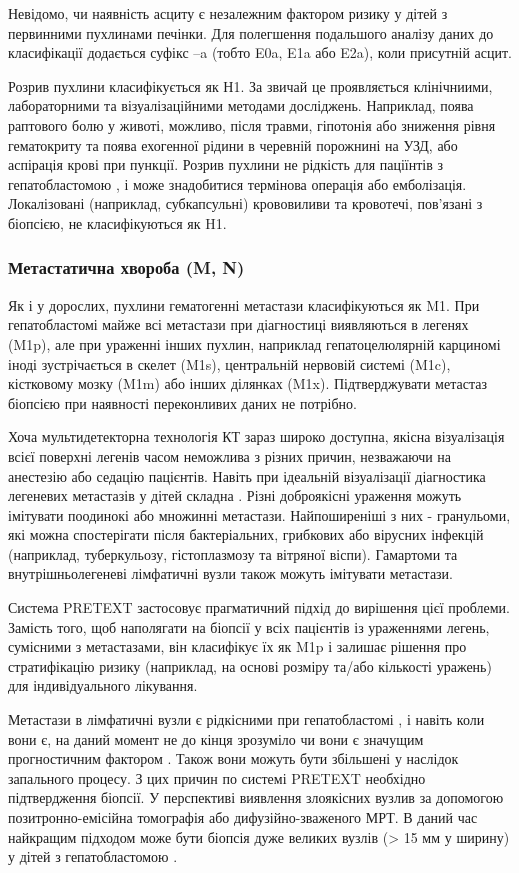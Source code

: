 Невідомо, чи наявність асциту є незалежним фактором ризику у дітей з первинними пухлинами печінки. Для полегшення подальшого аналізу даних до класифікації додається суфікс –a (тобто E0a, E1a або E2a), коли присутній асцит.

Розрив пухлини класифікується як Н1. За звичай це проявляється  клінічниими, лабораторними та візуалізаційними методами досліджень. Наприклад, поява раптового болю у животі, можливо, після травми, гіпотонія або зниження рівня гематокриту та поява ехогенної рідини в черевній порожнині на УЗД, або аспірація крові при пункції. Розрив пухлини не рідкість для паціїнтів з гепатобластомою \cite{pmid24132546}, і може знадобитися термінова операція або емболізація. Локалізовані (наприклад, субкапсульні) крововиливи та кровотечі, пов’язані з біопсією, не класифікуються як H1.
\subsubsection{Метастатична хвороба (M, N)}
Як і у дорослих, пухлини гематогенні метастази класифікуються як M1. При гепатобластомі майже всі метастази при діагностиці виявляються в легенях (M1p), але при ураженні інших пухлин, наприклад гепатоцелюлярній карциномі іноді зустрічається в скелет (M1s), центральній нервовій системі (M1c), кістковому мозку (M1m) або інших ділянках (M1x). Підтверджувати метастаз біопсією при наявності переконливих даних не потрібно.  

Хоча мультидетекторна технологія КТ зараз широко доступна, якісна візуалізація всієї поверхні легенів часом неможлива з різних причин, незважаючи на анестезію або седацію пацієнтів. Навіть при ідеальній візуалізації діагностика легеневих метастазів у дітей складна \cite{pmid24362406}. Різні доброякісні ураження можуть імітувати поодинокі або множинні метастази. Найпоширеніші з них - гранульоми, які можна спостерігати після бактеріальних, грибкових або вірусних інфекцій (наприклад, туберкульозу, гістоплазмозу та вітряної віспи). Гамартоми та внутрішньолегеневі лімфатичні вузли також можуть імітувати метастази.

Система PRETEXT застосовує прагматичний підхід до вирішення цієї проблеми. Замість того, щоб наполягати на біопсії у всіх пацієнтів із ураженнями легень, сумісними з метастазами, він класифікує їх як M1p і залишає рішення про стратифікацію ризику (наприклад, на основі розміру та/або кількості уражень) для індивідуального лікування. 

Метастази в лімфатичні вузли є рідкісними при гепатобластомі \cite{pmid24734315}, і навіть коли вони є, на даний момент не до кінця зрозуміло чи вони є значущим прогностичним фактором \cite{pmid24757164}. Також вони можуть бути збільшені у наслідок запального процесу. З цих причин по системі PRETEXT необхідно підтвердження біопсії. У перспективі виявлення злоякісних вузлив за допомогою позитронно-емісійна томографія або дифузійно-зваженого МРТ. В даний час найкращим підходом може бути біопсія дуже великих вузлів (> 15 мм у ширину) у дітей з гепатобластомою \cite{pmid24759227}. 

